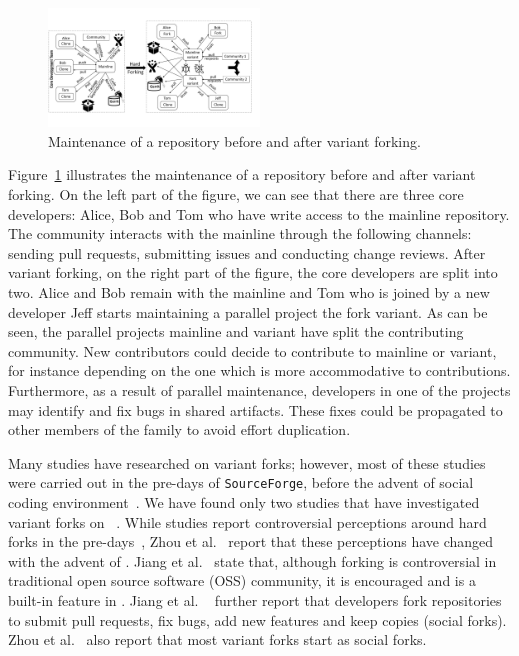 \begin{figure}[ht]
  \begin{center}
  \small
  \vspace{-10pt}
    \includegraphics[width=0.5\textwidth]{figures/Collaboration.pdf}
  \end{center}
  \caption{Maintenance of a repository before and after variant forking.}
  \vspace{-10pt}
  \label{fig:forking}
\end{figure}

Figure~\ref{fig:forking} illustrates the maintenance of a repository before and after variant forking.
On the left part of the figure, we can see that there are three core developers: Alice, Bob and Tom who have write access to the mainline repository.
The community interacts with the mainline through the following channels: sending pull requests, submitting issues and conducting change reviews.
After variant forking, on the right part of the figure, the core developers are split into two.
Alice and Bob remain with the mainline and Tom who is joined by a new developer Jeff starts maintaining a parallel project the fork variant.
As can be seen, the parallel projects mainline and variant have split the contributing community. New contributors could decide to contribute to mainline or variant, for instance depending on the one which is more accommodative to contributions.
Furthermore, as a result of parallel maintenance, developers in one of the projects may identify and fix bugs in shared artifacts.
These fixes could be propagated to other members of the family to avoid effort duplication.

Many studies have researched on variant forks; however, most of these studies were carried out in the pre-\scp days of \texttt{SourceForge}, before the advent of social coding environment~\cite{Linus:2012Perspectives,Gregorio:2012,Viseur:2012Forks,Linus:2013CodeForking,Laurent:2008,Linus:2011ToFork}.
We have found only two studies that have investigated variant forks on \gh~\cite{businge2018appfamilies,Zhou:2020}.
While studies report controversial perceptions around hard forks in the pre-\gh days~\cite{Chua:Forking:2017,Dixion:2009Forks,Ernst:2010,Linus:2011ToFork,Linus:2014Hackers,Raymond:Cathedral:2001}, Zhou et al.~\cite{Zhou:2020} report that these perceptions have changed with the advent of \gh. Jiang et al.~\cite{Lo:2017} state that, although forking is controversial in traditional open source software (OSS) community, it is encouraged and is a built-in feature in \gh. Jiang et al. ~\cite{Lo:2017} further report that developers fork repositories to submit pull requests, fix bugs, add new features and keep copies (social forks).
Zhou et al.~\cite{Zhou:2020} also report that most variant forks start as social forks.

